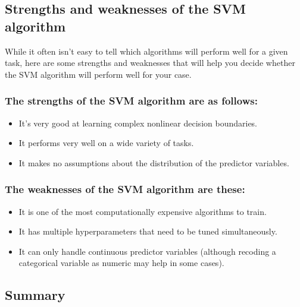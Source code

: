 \documentclass[
]{article}
\providecommand{\tightlist}{%
  \setlength{\itemsep}{0pt}\setlength{\parskip}{0pt}}
\begin{document}
\subsection{Strengths and weaknesses of the SVM
algorithm}\label{strengths-and-weaknesses-of-the-svm-algorithm}

While it often isn't easy to tell which algorithms will perform well for
a given task, here are some strengths and weaknesses that will help you
decide whether the SVM algorithm will perform well for your case.

\subsubsection{The strengths of the SVM algorithm are as
follows:}\label{the-strengths-of-the-svm-algorithm-are-as-follows}

\begin{itemize}
\tightlist
\item
  It's very good at learning complex nonlinear decision boundaries.
\item
  It performs very well on a wide variety of tasks.
\item
  It makes no assumptions about the distribution of the predictor
  variables.
\end{itemize}

\subsubsection{The weaknesses of the SVM algorithm are
these:}\label{the-weaknesses-of-the-svm-algorithm-are-these}

\begin{itemize}
\tightlist
\item
  It is one of the most computationally expensive algorithms to train.
\item
  It has multiple hyperparameters that need to be tuned simultaneously.
\item
  It can only handle continuous predictor variables (although recoding a
  categorical variable as numeric may help in some cases).
\end{itemize}

\subsection{Summary}\label{summary-3}
\end{document}
